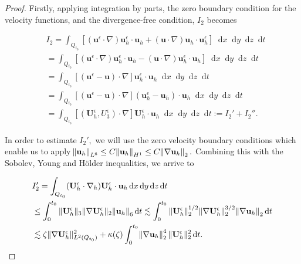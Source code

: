 \documentclass[11pt]{article}
\newcommand*\diff{\mathop{}\!\mathrm{d}}
\begin{document}
\begin{proof}
Firstly, applying integration by parts, the zero boundary condition for the velocity functions, and the divergence-free condition, $I_2$ becomes

\begin{equation}
\begin{split}
& I_2 = \int_{Q_{t_0}} [(\mathbf{u}^\epsilon \cdot \nabla) \mathbf{u}_h^\epsilon \cdot \mathbf{u}_h + (\mathbf{u} \cdot \nabla )\mathbf{u}_h \cdot \mathbf{u}_h^\epsilon] \diff x \diff y \diff z \diff t \\
& = \int_{Q_{t_0}} [(\mathbf{u}^\epsilon \cdot \nabla) \mathbf{u}_h^\epsilon \cdot \mathbf{u}_h - (\mathbf{u} \cdot \nabla )\mathbf{u}^\epsilon_h \cdot \mathbf{u}_h] \diff x \diff y \diff z \diff t \\
& = \int_{Q_{t_0}} [(\mathbf{u}^\epsilon - \mathbf{u}) \cdot \nabla ] \mathbf{u}_h^\epsilon \cdot \mathbf{u}_h \diff x \diff y \diff z \diff t \\
& = \int_{Q_{t_0}} [(\mathbf{u}^\epsilon - \mathbf{u}) \cdot \nabla ] (\mathbf{u}_h^\epsilon - \mathbf{u}_h) \cdot \mathbf{u}_h \diff x \diff y \diff z \diff t \\
& = \int_{Q_{t_0}} [(\mathbf{U}_h^\epsilon, U^\epsilon_3) \cdot \nabla ] \mathbf{U}_h^\epsilon \cdot \mathbf{u}_h \diff x \diff y \diff z \diff t := I_2' + I_2''.
\end{split}
\end{equation}

In order to estimate $I_2',$ we will use the zero velocity boundary conditions which enable us to apply $\norm{\mathbf{u}_h}_{L^6} \leq C \norm{\mathbf{u}_h}_{H^1} \leq C \norm{\nabla \mathbf{u}_h}_2.$ Combining this with the Sobolev, Young and H\"older inequalities, we arrive to

\begin{equation} \label{I_2_prime}
\begin{split}
& I_2'= \int_{Q_{t_0}} (\mathbf{U}^\epsilon_h \cdot \nabla_h) \mathbf{U}^\epsilon_h \cdot \mathbf{u}_h \diff x \diff y \diff z \diff t \\
& \leq \int_0^{t_0} \| \mathbf{U}^\epsilon_h \| _3 \| \nabla \mathbf{U}^\epsilon_h \| _2 \norm{\mathbf{u}_h}_6 \diff t \lesssim \int_0^{t_0} \| \mathbf{U}^\epsilon_h \| _2^{1/2} \| \nabla \mathbf{U}^\epsilon_h \|_2^{3/2} \norm{\nabla \mathbf{u}_h}_2 \diff t \\
& \lesssim \zeta \| \nabla \mathbf{U}^\epsilon_h \| ^2_{L^2(Q_{t_0})} + \kappa(\zeta) \int_0^{t_0} \norm{\nabla \mathbf{u}_h}_2^4 \| \mathbf{U}^\epsilon_h \| _2^2 \diff t.
\end{split}
\end{equation}


\end{proof}
\end{document}
